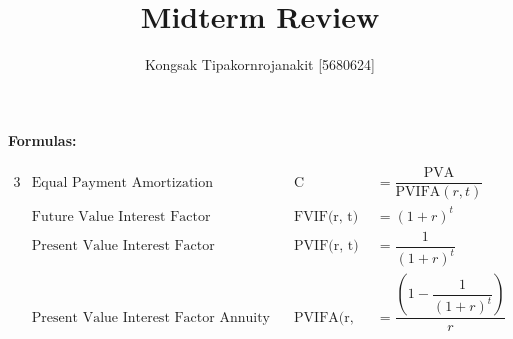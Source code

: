 \documentclass{article}
\begin{document}
\title{Midterm Review}
\author{Kongsak Tipakornrojanakit [5680624]}
\date{}
\maketitle


\textbf{Formulas:}


\begin{alignat}{3}
	\label{EPA}		&\mbox{Equal Payment Amortization} 				&\mbox{C} 				&=  \dfrac{\mbox{PVA}}{\mbox{PVIFA}(r, t)}\\
	\label{FVIF}	&\mbox{Future Value Interest Factor} 			&\mbox{FVIF(r, t)} 		&=  (1 + r)^t\\ 
	\label{PVIF}	&\mbox{Present Value Interest Factor} 			&\mbox{PVIF(r, t)} 		&=  \dfrac{1}{(1 + r)^t} \\
					&\mbox{Present Value Interest Factor Annuity} \hspace{2cm}	&\mbox{PVIFA(r, t)} 	&=  \dfrac{\left(1 - \dfrac{1}{(1 + r)^t}\right)}{r}
\end{alignat}
\end{document}
